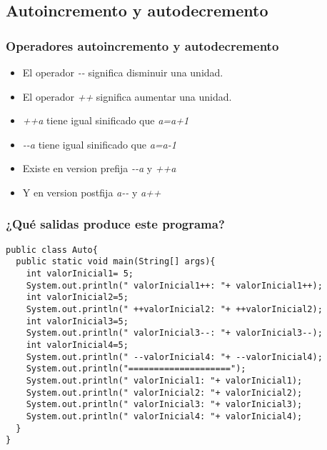 \documentclass{beamer}
\begin{document}
\subsection{Autoincremento y autodecremento}
\begin{frame}
\frametitle{Operadores autoincremento y autodecremento}
\begin{itemize}[<+-|alert@+>]
\item El operador \emph{-}\emph{-} significa disminuir una unidad.
\item El operador \emph{++} significa aumentar una unidad.
\item \emph{++a} tiene igual sinificado que \emph{a=a+1}
\item \emph{-}\emph{-a} tiene igual sinificado que \emph{a=a-1}
\item Existe en version prefija \emph{-}\emph{-a} y \emph{++a}
\item Y en version postfija \emph{a-}\emph{-} y \emph{a++}
\end{itemize}
\pause

\end{frame}

\begin{frame}[fragile]
\frametitle{¿Qué salidas produce este programa?}
\begin{small}
\begin{verbatim}
public class Auto{
  public static void main(String[] args){
    int valorInicial1= 5;
    System.out.println(" valorInicial1++: "+ valorInicial1++);
    int valorInicial2=5;
    System.out.println(" ++valorInicial2: "+ ++valorInicial2);
    int valorInicial3=5;
    System.out.println(" valorInicial3--: "+ valorInicial3--);
    int valorInicial4=5;
    System.out.println(" --valorInicial4: "+ --valorInicial4);
    System.out.println("====================");
    System.out.println(" valorInicial1: "+ valorInicial1);
    System.out.println(" valorInicial2: "+ valorInicial2);
    System.out.println(" valorInicial3: "+ valorInicial3);
    System.out.println(" valorInicial4: "+ valorInicial4);
  }
}
\end{verbatim}
\end{small}
\end{frame}
\end{document}
